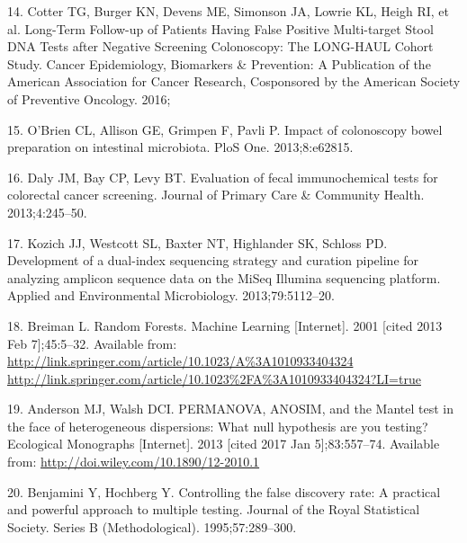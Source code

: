 \documentclass[12pt,]{article}
\begin{document}
\hypertarget{ref-cotter_long-term_2016}{}
14. Cotter TG, Burger KN, Devens ME, Simonson JA, Lowrie KL, Heigh RI,
et al. Long-Term Follow-up of Patients Having False Positive
Multi-target Stool DNA Tests after Negative Screening Colonoscopy: The
LONG-HAUL Cohort Study. Cancer Epidemiology, Biomarkers \& Prevention: A
Publication of the American Association for Cancer Research, Cosponsored
by the American Society of Preventive Oncology. 2016;

\hypertarget{ref-obrien_impact_2013}{}
15. O'Brien CL, Allison GE, Grimpen F, Pavli P. Impact of colonoscopy
bowel preparation on intestinal microbiota. PloS One. 2013;8:e62815.

\hypertarget{ref-daly_evaluation_2013}{}
16. Daly JM, Bay CP, Levy BT. Evaluation of fecal immunochemical tests
for colorectal cancer screening. Journal of Primary Care \& Community
Health. 2013;4:245--50.

\hypertarget{ref-kozich_development_2013}{}
17. Kozich JJ, Westcott SL, Baxter NT, Highlander SK, Schloss PD.
Development of a dual-index sequencing strategy and curation pipeline
for analyzing amplicon sequence data on the MiSeq Illumina sequencing
platform. Applied and Environmental Microbiology. 2013;79:5112--20.

\hypertarget{ref-breiman_random_2001}{}
18. Breiman L. Random Forests. Machine Learning {[}Internet{]}. 2001
{[}cited 2013 Feb 7{]};45:5--32. Available from:
\href{http://link.springer.com/article/10.1023/A\%3A1010933404324\%20http://link.springer.com/article/10.1023\%2FA\%3A1010933404324?LI=true}{http://link.springer.com/article/10.1023/A\%3A1010933404324 http://link.springer.com/article/10.1023\%2FA\%3A1010933404324?LI=true}

\hypertarget{ref-anderson_permanova_2013}{}
19. Anderson MJ, Walsh DCI. PERMANOVA, ANOSIM, and the Mantel test in
the face of heterogeneous dispersions: What null hypothesis are you
testing? Ecological Monographs {[}Internet{]}. 2013 {[}cited 2017 Jan
5{]};83:557--74. Available from:
\url{http://doi.wiley.com/10.1890/12-2010.1}

\hypertarget{ref-benjamini_controlling_1995}{}
20. Benjamini Y, Hochberg Y. Controlling the false discovery rate: A
practical and powerful approach to multiple testing. Journal of the
Royal Statistical Society. Series B (Methodological). 1995;57:289--300.
\end{document}
